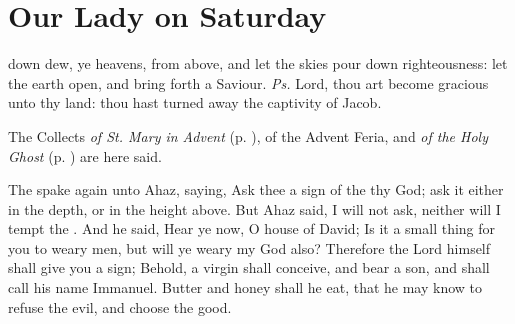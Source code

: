    \fancyhead[RO,LE]{}
   \fancyhead[RE,LO]{}
\section{Our Lady on Saturday}\label{MarySaturday}
\fancyhead[RE,LO]{}
\introit
{} down dew, ye heavens, from above, and let the skies pour down righteousness: let the earth open, and bring forth a Saviour. \textit{Ps.} Lord, thou art become gracious unto thy land: thou hast turned away the captivity of Jacob.
\begin{rubric}
    The Collects \emph{of St. Mary in Advent} (p. \pageref{SPMaryInAdvent}), of the Advent Feria, and \emph{of the Holy Ghost} (p. \pageref{SPHolyGhost}) are here said.
\end{rubric}
 The  spake again unto Ahaz, saying, Ask thee a sign of the  thy God; ask it either in the depth, or in the height above. But Ahaz said, I will not ask, neither will I tempt the . And he said, Hear ye now, O house of David; Is it a small thing for you to weary men, but will ye weary my God also? Therefore the Lord himself shall give you a sign; Behold, a virgin shall conceive, and bear a son, and shall call his name Immanuel. Butter and honey shall he eat, that he may know to refuse the evil, and choose the good.
